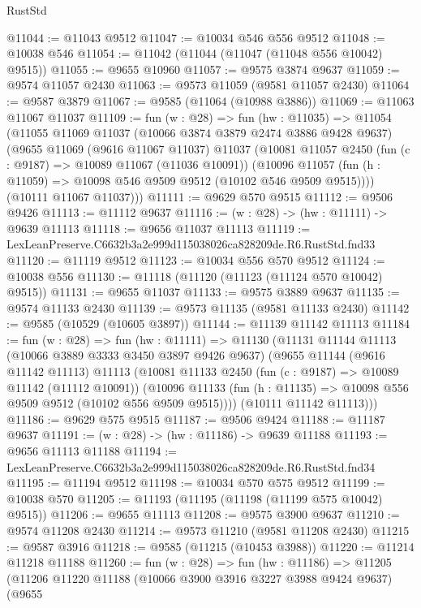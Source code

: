 \begin{lexlean}{RustStd}
\begin{coremodule}
@11044 := @11043 @9512
@11047 := @10034 @546 @556 @9512
@11048 := @10038 @546
@11054 := @11042 (@11044 (@11047 (@11048 @556 @10042) @9515))
@11055 := @9655 @10960
@11057 := @9575 @3874 @9637
@11059 := @9574 @11057 @2430
@11063 := @9573 @11059 (@9581 @11057 @2430)
@11064 := @9587 @3879
@11067 := @9585 (@11064 (@10988 @3886))
@11069 := @11063 @11067 @11037
@11109 := fun (w : @28) =>
  fun (hw : @11035) =>
  @11054
    (@11055
      @11069
      @11037
      (@10066 @3874 @3879 @2474 @3886 @9428 @9637)
      (@9655
        @11069
        (@9616 @11067 @11037)
        @11037
        (@10081
          @11057
          @2450
          (fun (c : @9187) => @10089 @11067 (@11036 @10091))
          (@10096 @11057 (fun (h : @11059) => @10098 @546 @9509 @9512 (@10102 @546 @9509 @9515))))
        (@10111 @11067 @11037)))
@11111 := @9629 @570 @9515
@11112 := @9506 @9426
@11113 := @11112 @9637
@11116 := (w : @28) -> (hw : @11111) -> @9639 @11113
@11118 := @9656 @11037 @11113
@11119 := LexLeanPreserve.C6632b3a2e999d115038026ca828209de.R6.RustStd.fnd33
@11120 := @11119 @9512
@11123 := @10034 @556 @570 @9512
@11124 := @10038 @556
@11130 := @11118 (@11120 (@11123 (@11124 @570 @10042) @9515))
@11131 := @9655 @11037
@11133 := @9575 @3889 @9637
@11135 := @9574 @11133 @2430
@11139 := @9573 @11135 (@9581 @11133 @2430)
@11142 := @9585 (@10529 (@10605 @3897))
@11144 := @11139 @11142 @11113
@11184 := fun (w : @28) =>
  fun (hw : @11111) =>
  @11130
    (@11131
      @11144
      @11113
      (@10066 @3889 @3333 @3450 @3897 @9426 @9637)
      (@9655
        @11144
        (@9616 @11142 @11113)
        @11113
        (@10081
          @11133
          @2450
          (fun (c : @9187) => @10089 @11142 (@11112 @10091))
          (@10096 @11133 (fun (h : @11135) => @10098 @556 @9509 @9512 (@10102 @556 @9509 @9515))))
        (@10111 @11142 @11113)))
@11186 := @9629 @575 @9515
@11187 := @9506 @9424
@11188 := @11187 @9637
@11191 := (w : @28) -> (hw : @11186) -> @9639 @11188
@11193 := @9656 @11113 @11188
@11194 := LexLeanPreserve.C6632b3a2e999d115038026ca828209de.R6.RustStd.fnd34
@11195 := @11194 @9512
@11198 := @10034 @570 @575 @9512
@11199 := @10038 @570
@11205 := @11193 (@11195 (@11198 (@11199 @575 @10042) @9515))
@11206 := @9655 @11113
@11208 := @9575 @3900 @9637
@11210 := @9574 @11208 @2430
@11214 := @9573 @11210 (@9581 @11208 @2430)
@11215 := @9587 @3916
@11218 := @9585 (@11215 (@10453 @3988))
@11220 := @11214 @11218 @11188
@11260 := fun (w : @28) =>
  fun (hw : @11186) =>
  @11205
    (@11206
      @11220
      @11188
      (@10066 @3900 @3916 @3227 @3988 @9424 @9637)
      (@9655

\end{coremodule}
\end{lexlean}

